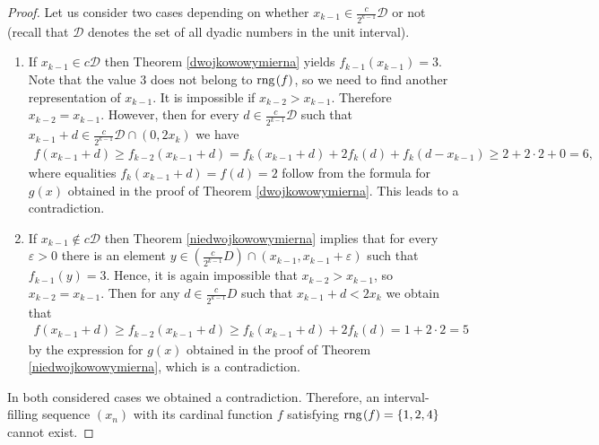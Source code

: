 \documentclass{amsart}
\newtheorem{corollary}[theorem]{Corollary}
\theoremstyle{definition}
\newcommand{\rng}{{\rm rng} \hspace{0.03cm}}
\begin{document}
\begin{proof}
Let us consider two cases depending on whether $x_{k-1}\in \frac{c}{2^{k-1}}\mathcal{D}$ or not (recall that $\mathcal{D}$ denotes the set of all dyadic numbers in the unit interval).
\begin{enumerate}
	\item If $x_{k-1}\in c\mathcal{D}$ then Theorem \ref{dwojkowowymierna} yields $f_{k-1}(x_{k-1})=3$. Note that the value $3$ does not belong to $\rng (f)$, so we need to find another representation of $x_{k-1}$. It is impossible if $x_{k-2}>x_{k-1}$. Therefore $x_{k-2}=x_{k-1}$. However, then for every $d\in \frac{c}{2^{k-1}}\mathcal{D}$ such that $x_{k-1}+d\in \frac{c}{2^{k-1}}\mathcal{D}\cap(0,2x_k)$ we have 
\begin{align*}
f(x_{k-1}+d)\geq f_{k-2}(x_{k-1}+d)= f_{k}(x_{k-1}+d)+2f_k(d)+f_{k}(d-x_{k-1})\geq 2+2\cdot 2+0 =6,
\end{align*}
where equalities $f_{k}(x_{k-1}+d)=f(d)=2$ follow from the formula for $g(x)$ obtained in the proof of Theorem \ref{dwojkowowymierna}. This leads to a contradiction.
	\item If $x_{k-1}\notin c\mathcal{D}$ then Theorem \ref{niedwojkowowymierna} implies that for every $\varepsilon >0$ there is an element $y\in \left(\frac{c}{2^{k-1}}D\right)\cap(x_{k-1},x_{k-1}+\varepsilon)$ such that $f_{k-1}(y)=3$. Hence, it is again impossible that $x_{k-2}>x_{k-1}$, so $x_{k-2}=x_{k-1}$. Then for any $d\in \frac{c}{2^{k-1}}D$ such that $x_{k-1}+d<2x_k$ we obtain that 
\begin{align*}
f(x_{k-1}+d)\geq f_{k-2}(x_{k-1}+d)\geq f_{k}(x_{k-1}+d)+ 2f_k(d)=1+2\cdot 2=5
\end{align*}
by the expression for $g(x)$ obtained in the proof of Theorem \ref{niedwojkowowymierna}, which is a contradiction.
\end{enumerate}
In both considered cases we obtained a contradiction. Therefore, an interval-filling sequence $(x_n)$ with its cardinal function $f$ satisfying $\rng (f)=\{1,2,4\}$ cannot exist.
\end{proof}


\end{document}
